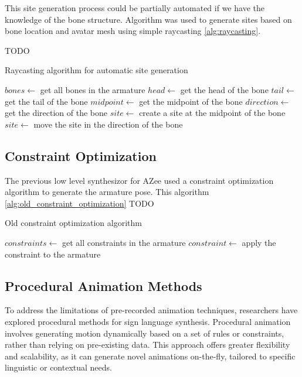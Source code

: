 \documentclass[../../main.tex]{subfiles}
\begin{document}
This site generation process could be partially automated if we have the knowledge of the bone structure. Algorithm was used to generate sites based on bone location and avatar mesh using simple raycasting \ref{alg:raycasting}.

TODO
\begin{algorithm}
    \label{alg:raycasting}
    \caption{Raycasting algorithm for automatic site generation}
    \begin{algorithmic}
        \State $bones \gets$ get all bones in the armature
            \State $head \gets$ get the head of the bone
            \State $tail \gets$ get the tail of the bone
            \State $midpoint \gets$ get the midpoint of the bone
            \State $direction \gets$ get the direction of the bone
            \State $site \gets$ create a site at the midpoint of the bone
            \State $site \gets$ move the site in the direction of the bone
        \EndFor
    \end{algorithmic}
\end{algorithm}

\subsection{Constraint Optimization}

The previous low level synthesizor for AZee \cite{fabrizio} used a constraint optimization algorithm to generate the armature pose. This algorithm \ref{alg:old_constraint_optimization} TODO


\begin{algorithm}
    \label{alg:old_constraint_optimization}
    \caption{Old constraint optimization algorithm}
    \begin{algorithmic}
        \State $constraints \gets$ get all constraints in the armature
            \State $constraint \gets$ apply the constraint to the armature
        \EndFor
    \end{algorithmic}
\end{algorithm}



\subsection{Procedural Animation Methods}
To address the limitations of pre-recorded animation techniques, researchers have explored procedural methods for sign language synthesis. Procedural animation involves generating motion dynamically based on a set of rules or constraints, rather than relying on pre-existing data. This approach offers greater flexibility and scalability, as it can generate novel animations on-the-fly, tailored to specific linguistic or contextual needs.
\end{document}
